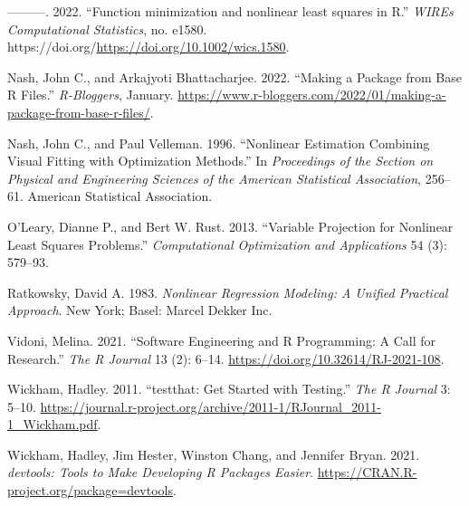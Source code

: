 \documentclass[
]{article}
\newlength{\cslhangindent}
\newlength{\cslentryspacingunit} %
\newenvironment{CSLReferences}[2] %
 {%
  \setlength{\parindent}{0pt}
  \ifodd #1
  \let\oldpar\par
  \def\par{\hangindent=\cslhangindent\oldpar}
  \fi
  \setlength{\parskip}{#2\cslentryspacingunit}
 }%
 {}
\begin{document}
\begin{CSLReferences}{1}{0}
\leavevmode{}%
---------. 2022. {``{Function minimization and nonlinear least squares
in R}.''} \emph{WIREs Computational Statistics}, no. e1580.
https://doi.org/\url{https://doi.org/10.1002/wics.1580}.

\leavevmode{}%
Nash, John C., and Arkajyoti Bhattacharjee. 2022. {``Making a Package
from Base {R} Files.''} \emph{R-Bloggers}, January.
\url{https://www.r-bloggers.com/2022/01/making-a-package-from-base-r-files/}.

\leavevmode{}%
Nash, John C., and Paul Velleman. 1996. {``Nonlinear Estimation
Combining Visual Fitting with Optimization Methods.''} In
\emph{Proceedings of the Section on Physical and Engineering Sciences of
the American Statistical Association}, 256--61. American Statistical
Association.

\leavevmode{}%
O'Leary, Dianne P., and Bert W. Rust. 2013. {``Variable Projection for
Nonlinear Least Squares Problems.''} \emph{Computational Optimization
and Applications} 54 (3): 579--93.

\leavevmode{}%
Ratkowsky, David A. 1983. \emph{Nonlinear Regression Modeling: A Unified
Practical Approach}. New York; Basel: Marcel Dekker Inc.

\leavevmode{}%
Vidoni, Melina. 2021. {``{Software Engineering and R Programming: A Call
for Research}.''} \emph{{The R Journal}} 13 (2): 6--14.
\url{https://doi.org/10.32614/RJ-2021-108}.

\leavevmode{}%
Wickham, Hadley. 2011. {``{testthat: Get Started with Testing}.''}
\emph{The R Journal} 3: 5--10.
\url{https://journal.r-project.org/archive/2011-1/RJournal_2011-1_Wickham.pdf}.

\leavevmode{}%
Wickham, Hadley, Jim Hester, Winston Chang, and Jennifer Bryan. 2021.
\emph{{devtools: Tools to Make Developing R Packages Easier}}.
\url{https://CRAN.R-project.org/package=devtools}.

\end{CSLReferences}
\end{document}
